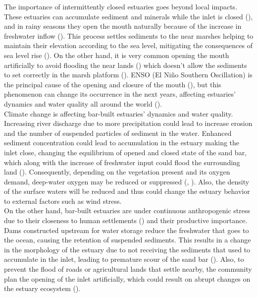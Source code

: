 \documentclass[11pt,letterpaper]{article}
\begin{document}
The importance of intermittently closed estuaries goes beyond local impacts. These estuaries can accumulate sediment and minerals while the inlet is closed (\cite{thorne2021wetlands}), and in rainy seasons they open the mouth naturally because of the increase in freshwater inflow (\cite{hoeksema2018factors}). This process settles sediments to the near marshes helping to maintain their elevation according to the sea level, mitigating the consequences of sea level rise (\cite{thorne2021wetlands}). On the other hand, it is very common opening the mouth artificially to avoid flooding the near lands (\cite{Behrens2013}) which doesn't allow the sediments to set correctly in the marsh platform  (\cite{thorne2021wetlands}). ENSO (El Niño Southern Oscillation) is the principal cause of the opening and closure of the mouth (\cite{mcsweeney2017intermittently}), but this phenomenon can change its occurrence in the next years, affecting estuaries' dynamics and water quality all around the world (\cite{thorne2021wetlands}).\\

Climate change is affecting bar-built estuaries' dynamics and water quality. Increasing river discharge due to more precipitation could lead to increase erosion and the number of suspended particles of sediment in the water. Enhanced sediment concentration could lead to accumulation in the estuary making the inlet close, changing the equilibrium of opened and closed state of the sand bar, which along with the increase of freshwater input could flood the surrounding land (\cite{peeters2009currents}). Consequently, depending on the vegetation present and its oxygen demand, deep-water oxygen may be reduced or suppressed (\cite{Kelly2018}, \cite{Largier2021}). Also, the density of the surface waters will be reduced and thus could change the estuary behavior to external factors such as wind stress. \\

On the other hand, bar-built estuaries are under continuous anthropogenic stress due to their closeness to human settlements (\cite{clark2019systematic}) and their productive importance. Dams constructed upstream for water storage reduce the freshwater that goes to the ocean, causing the retention of suspended sediments. This results in a change in the morphology of the estuary due to not receiving the sediments that used to accumulate in the inlet, leading to premature scour of the sand bar (\cite{peeters2009currents}). Also, to prevent the flood of roads or agricultural lands that settle nearby, the community plan the opening of the inlet artificially, which could result on abrupt changes on the estuary ecosystem (\cite{Behrens2013}). \\
\end{document}
